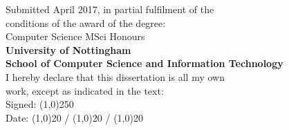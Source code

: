 \documentclass[]{article}
\newcommand{\bld}[1]{\textbf{#1}}
\begin{document}
\begin{center}
\normalsize{
Submitted April 2017, in partial fulfilment of the\\ conditions of the award of the degree:\\[\baselinestretch 0.3cm]
%
Computer Science MSci Honours\\[\baselinestretch 0.3cm]
\bld{University of Nottingham}\\ \bld{School of Computer Science and Information Technology}\\[\baselinestretch 0.3cm]
%
I hereby declare that this dissertation is all my own\\ work, except as indicated in the text:\\[\baselinestretch 0.3cm]
%
Signed: \line(1,0){250}\\[\baselinestretch 0.5cm]
Date: \line(1,0){20} / \line(1,0){20} / \line(1,0){20}
}
\end{center}
\pagebreak
\tableofcontents
\pagebreak
\listoffigures
\pagebreak
{}











\appendix
%
%
%
%
%
%

\end{document}
